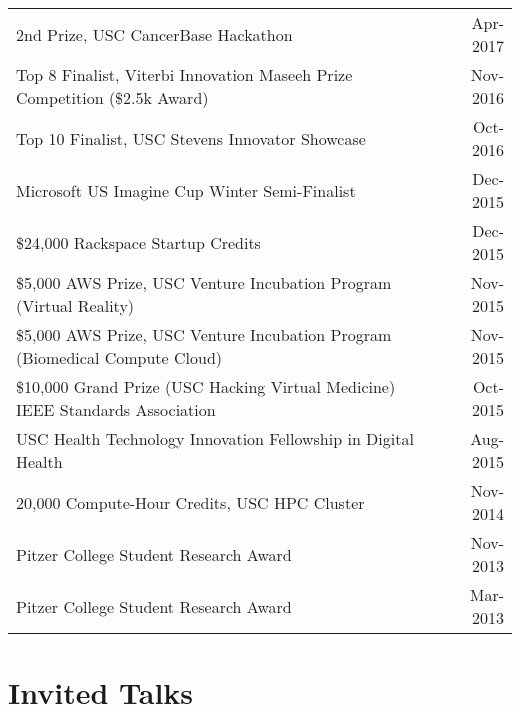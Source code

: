 \documentclass[10pt,a4paper]{article}
\begin{document}
  \vspace*{1mm}\noindent\begin{tabularx}{17cm}{X r}
    2nd Prize, USC CancerBase Hackathon & Apr-2017 \\ %
    Top 8 Finalist, Viterbi Innovation Maseeh Prize Competition (\$2.5k Award) & Nov-2016 \\ %
    Top 10 Finalist, USC Stevens Innovator Showcase & Oct-2016 \\ %
    Microsoft US Imagine Cup Winter Semi-Finalist & Dec-2015 \\
    \$24,000 Rackspace Startup Credits & Dec-2015\\
    \$5,000 AWS Prize, USC Venture Incubation Program (Virtual Reality) & Nov-2015\\
    \$5,000 AWS Prize, USC Venture Incubation Program (Biomedical Compute Cloud) & Nov-2015\\
    \$10,000 Grand Prize (USC Hacking Virtual Medicine) IEEE Standards Association  & Oct-2015\\ %
    USC Health Technology Innovation Fellowship in Digital Health& Aug-2015\\ 
    20,000 Compute-Hour Credits, USC HPC Cluster & Nov-2014 \\
    Pitzer College Student Research Award & Nov-2013 \\
    Pitzer College Student Research Award & Mar-2013 \\
  \end{tabularx}



  \vspace*{2mm}\section*{Invited Talks}
\end{document}
